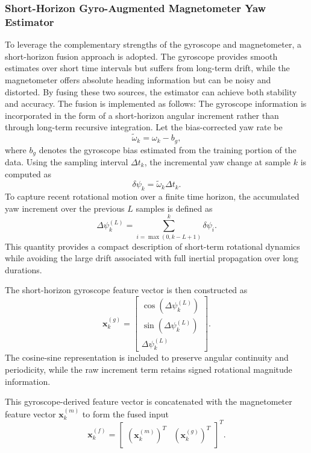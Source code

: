 \documentclass[subscriptcorrection,upint,varvw,barcolor=Goldenrod3,mathalfa=cal=euler,balance,hyphenate,pdf-a]{asmejour}
\begin{document}
\subsubsection{Short-Horizon Gyro-Augmented Magnetometer Yaw Estimator}
To leverage the complementary strengths of the gyroscope and magnetometer, a short-horizon fusion approach is adopted. The gyroscope provides smooth estimates over short time intervals but suffers from long-term drift, while the magnetometer offers absolute heading information but can be noisy and distorted. By fusing these two sources, the estimator can achieve both stability and accuracy. The fusion is implemented as follows:
The gyroscope information is incorporated in the form of a short-horizon angular increment rather than through long-term recursive integration. Let the bias-corrected yaw rate be
\begin{equation*}
\tilde{\omega}_k = \omega_k - b_g,
\end{equation*}
where \(b_g\) denotes the gyroscope bias estimated from the training portion of the data. Using the sampling interval \(\Delta t_k\), the incremental yaw change at sample \(k\) is computed as
\begin{equation}
\delta \psi_k = \tilde{\omega}_k \Delta t_k.
\end{equation}
To capture recent rotational motion over a finite time horizon, the accumulated yaw increment over the previous \(L\) samples is defined as
\begin{equation}
\Delta \psi_k^{(L)} = \sum_{i=\max(0,k-L+1)}^{k} \delta\psi_i.
\end{equation}
This quantity provides a compact description of short-term rotational dynamics while avoiding the large drift associated with full inertial propagation over long durations.

The short-horizon gyroscope feature vector is then constructed as
\begin{equation}
\mathbf{x}_k^{(g)} =
\begin{bmatrix}
\cos\!\left(\Delta\psi_k^{(L)}\right) \\
\sin\!\left(\Delta\psi_k^{(L)}\right) \\
\Delta\psi_k^{(L)}
\end{bmatrix}.
\end{equation}
The cosine-sine representation is included to preserve angular continuity and periodicity, while the raw increment term retains signed rotational magnitude information.

This gyroscope-derived feature vector is concatenated with the magnetometer feature vector \(\mathbf{x}_k^{(m)}\) to form the fused input
\begin{equation}
\mathbf{x}_k^{(f)} =
\begin{bmatrix}
(\mathbf{x}_k^{(m)})^T & (\mathbf{x}_k^{(g)})^T
\end{bmatrix}^{T}.
\end{equation}
\end{document}
